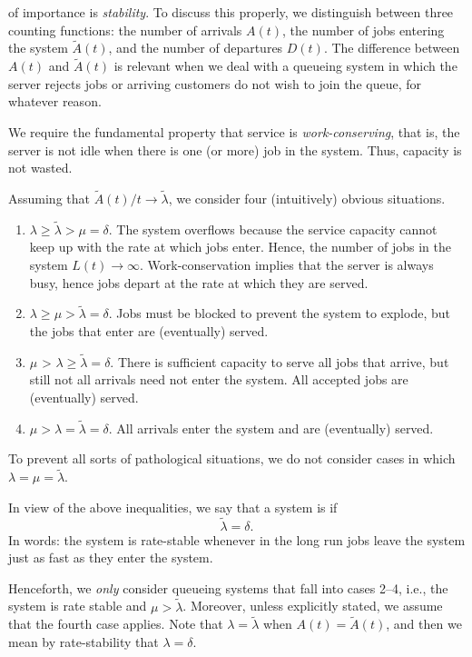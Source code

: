 \documentclass[queueing-book.tex]{subfiles}
\begin{document}
 of importance is \emph{stability}.
To discuss this properly, we distinguish between three counting functions: the number of arrivals $A(t)$, the number of jobs entering the system $\tilde A(t)$, and the number of departures $D(t)$.
The difference between $A(t)$ and $\tilde A(t)$ is relevant when we deal with a queueing system in which the server rejects jobs or arriving customers do not wish to join the queue, for whatever reason.

We require the fundamental property that service is \emph{work-conserving}, that is, the server is not idle when there is one (or more) job in the system.
Thus, capacity is not wasted.

Assuming that $\tilde A(t)/t \to \tilde \lambda$, we consider four (intuitively) obvious situations.
\begin{enumerate}
\item $\lambda \geq \tilde \lambda > \mu = \delta$. The system overflows because the service capacity cannot keep up with the rate at which jobs enter. Hence, the number of jobs in the system $L(t) \to \infty$. Work-conservation implies that the server is always busy, hence jobs depart at the rate at which they are served.
\item $\lambda \geq \mu > \tilde \lambda = \delta$. Jobs must be  blocked to prevent the system to explode, but the jobs that enter are (eventually) served.
\item $\mu$ > $\lambda \geq \tilde \lambda = \delta$.
There is sufficient capacity to serve all jobs that arrive, but still not all arrivals need not enter the system.
All accepted jobs are (eventually) served.
\item $\mu > \lambda = \tilde \lambda = \delta$. All arrivals enter the system and are (eventually) served.
\end{enumerate}
To prevent all sorts of pathological situations, we do not consider cases in which $\lambda = \mu = \tilde \lambda$.

In view of the above inequalities, we say that a system is  if
\begin{equation*}
\tilde \lambda = \delta.
\end{equation*}
In words: the system is rate-stable whenever in the long run jobs leave the system just as fast as they enter the system.

Henceforth, we \emph{only} consider queueing systems that fall into cases 2--4, i.e.,  the system is rate stable and $\mu > \tilde \lambda$.
Moreover, unless explicitly stated, we assume that the fourth case applies.
Note that $\lambda = \tilde \lambda$ when $A(t) = \tilde A(t)$, and then we mean by rate-stability that $\lambda = \delta$.
\end{document}
